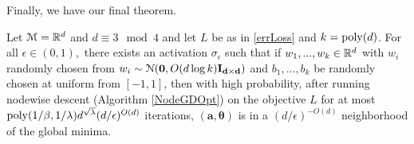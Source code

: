 Finally, we have our final theorem.

\begin{theorem}\label{nodewise}
Let $\mathcal{M} = {\mathbb{R}}^{d}$ and $d \equiv 3 \mod 4$ and let $L$ be as in \ref{errLoss} and $k = \mathrm{poly}(d)$. For all $\epsilon \in (0,1),$ there exists an activation $\sigma_\epsilon$ such that if $w_1,...,w_k \in {\mathbb{R}}^d$ with $w_i$ randomly chosen from $w_i \sim  \mathcal{N}({\bf 0}, O(d\log k){\bf I_{d\times d}})$ and $b_1,...,b_k$ be randomly chosen at uniform from $[-1,1]$, then with high probability, after running nodewise descent (Algorithm \ref{NodeGDOpt}) on the objective $L$ for at most $\mathrm{poly}(1/\beta,1/\lambda)d^{\sqrt{\lambda}}(d/\epsilon)^{O(d)}$ iterations, $\boldsymbol{(a,\theta)}$ is in a $(d/\epsilon)^{-O(d)}$ neighborhood of the global minima.
\end{theorem}

